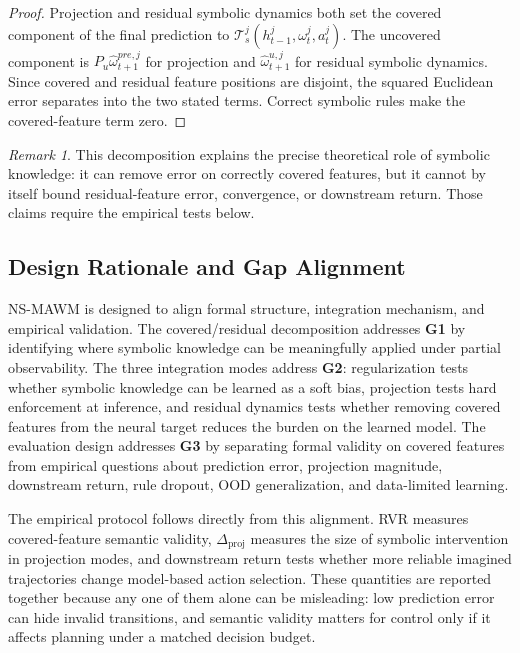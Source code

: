 \documentclass{article}
\theoremstyle{plain}
\theoremstyle{definition}
\theoremstyle{remark}
\newtheorem{remark}[theorem]{Remark}
\begin{document}
\begin{proof}
  Projection and residual symbolic dynamics both set the covered component of
  the final prediction to $\mathcal{T}^j_s(h^j_{t-1},\omega^j_t,a^j_t)$. The
  uncovered component is $P_u\hat{\omega}^{pre,j}_{t+1}$ for projection and
  $\hat{\omega}^{u,j}_{t+1}$ for residual symbolic dynamics. Since covered and
  residual feature positions are disjoint, the squared Euclidean error separates
  into the two stated terms. Correct symbolic rules make the covered-feature
  term zero.
\end{proof}

\begin{remark}
  This decomposition explains the precise theoretical role of symbolic
  knowledge: it can remove error on correctly covered features, but it cannot
  by itself bound residual-feature error, convergence, or downstream return.
  Those claims require the empirical tests below.
\end{remark}

\subsection{Design Rationale and Gap Alignment}
\label{sec:design_rationale}

NS-MAWM is designed to align formal structure, integration mechanism, and empirical validation. The covered/residual decomposition addresses \textbf{G1} by identifying where symbolic knowledge can be meaningfully applied under partial observability. The three integration modes address \textbf{G2}: regularization tests whether symbolic knowledge can be learned as a soft bias, projection tests hard enforcement at inference, and residual dynamics tests whether removing covered features from the neural target reduces the burden on the learned model. The evaluation design addresses \textbf{G3} by separating formal validity on covered features from empirical questions about prediction error, projection magnitude, downstream return, rule dropout, OOD generalization, and data-limited learning.

The empirical protocol follows directly from this alignment. RVR measures covered-feature semantic validity, $\Delta_{\mathrm{proj}}$ measures the size of symbolic intervention in projection modes, and downstream return tests whether more reliable imagined trajectories change model-based action selection. These quantities are reported together because any one of them alone can be misleading: low prediction error can hide invalid transitions, and semantic validity matters for control only if it affects planning under a matched decision budget.
\end{document}
